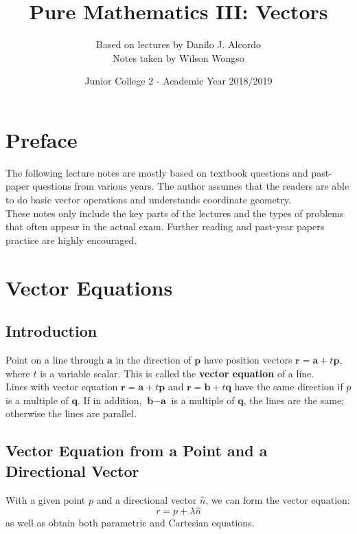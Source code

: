 \documentclass[hidelinks, a4paper, 12pt]{article}
\title{Pure Mathematics III: Vectors}
\author{Based on lectures by Danilo J. Alcordo \\ Notes taken by Wilson Wongso}
\date{Junior College 2 - Academic Year 2018/2019}
\newcommand{\bd}{\textbf}
\newcommand{\nhat}{\hat{n}}
\begin{document}
    \maketitle
    
    \tableofcontents

    \section{Preface}
        The following lecture notes are mostly based on textbook \cite{neill2016cambridge} questions and past-paper questions from various years.
        The author assumes that the readers are able to do basic vector operations and understands coordinate geometry.\\[\baselineskip]
        These notes only include the key parts of the lectures and the types of problems that often appear in the actual exam.
        Further reading and past-year papers practice are highly encouraged.
    
    \section{Vector Equations}
        \subsection{Introduction}
            Point on a line through $\bd{a}$ in the direction of $\textbf{p}$ have position vectors $\textbf{r} = \textbf{a} + t\textbf{p}$, where $t$ is a
            variable scalar. This is called the \textbf{vector equation} of a line.\\[\baselineskip]
            Lines with vector equation $\textbf{r} = \textbf{a} + t\textbf{p}$ and $\textbf{r} = \textbf{b} + t\textbf{q}$ have the same direction if \textbf{$p$}
            is a multiple of $\textbf{q}$. If in addition, $\textbf{b} - \textbf{a}$ is a multiple of $\textbf{q}$, the lines are the same; otherwise the lines
            are parallel.
        
        \subsection{Vector Equation from a Point and a Directional Vector}
            With a given point $p$ and a directional vector $\hat{n}$, we can form the vector equation:
            \[r = p + \lambda \nhat\]
            as well as obtain both parametric and Cartesian equations.
\end{document}
